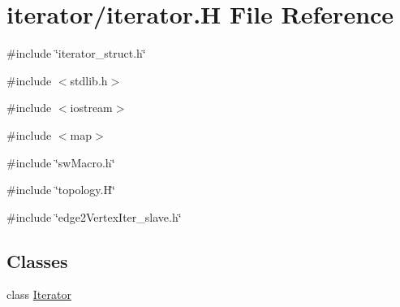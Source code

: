 \hypertarget{iterator_8H}{
\section{iterator/iterator.H File Reference}
\label{iterator_8H}
}
{\ttfamily \#include \char`\"{}iterator\_\-struct.h\char`\"{}}\par
{\ttfamily \#include $<$stdlib.h$>$}\par
{\ttfamily \#include $<$iostream$>$}\par
{\ttfamily \#include $<$map$>$}\par
{\ttfamily \#include \char`\"{}swMacro.h\char`\"{}}\par
{\ttfamily \#include \char`\"{}topology.H\char`\"{}}\par
{\ttfamily \#include \char`\"{}edge2VertexIter\_\-slave.h\char`\"{}}\par
\subsection*{Classes}
\begin{DoxyCompactItemize}
\item 
class \hyperlink{classIterator}{Iterator}
\end{DoxyCompactItemize}
